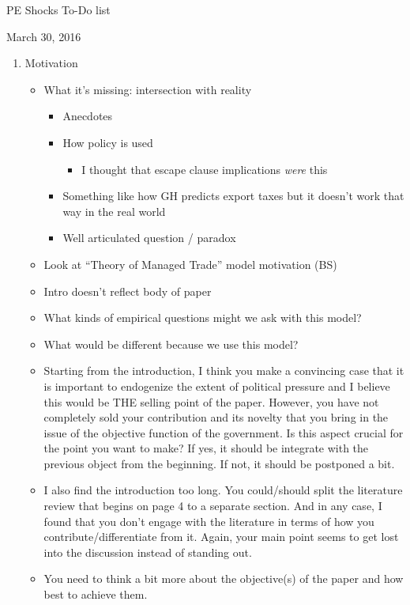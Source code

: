 \documentclass[12pt]{article}
\begin{document}
\begin{center}
PE Shocks To-Do list
\end{center}

March 30, 2016
\begin{enumerate}
	\item Motivation
		\begin{itemize}
			\item What it's missing: intersection with reality
				\begin{itemize}
					\item Anecdotes
					\item How policy is used
						\begin{itemize}
							\item I thought that escape clause implications \textit{were} this
						\end{itemize}
					\item Something like how GH predicts export taxes but it doesn't work that way in the real world
					\item Well articulated question / paradox
				\end{itemize}
			\item Look at ``Theory of Managed Trade'' model motivation (BS)
			\item Intro doesn't reflect body of paper
			\item What kinds of empirical questions might we ask with this model?
			\item What would be different because we use this model?
			\item Starting from the introduction, I think you make a convincing case that it is important to endogenize the extent of political pressure and I believe this would be THE selling point of the paper. However, you have not completely sold your contribution and its novelty that you bring in the issue of the objective function of the government. Is this aspect crucial for the point you want to make? If yes, it should be integrate with the previous object from the beginning. If not, it should be postponed a bit.
			\item I also find the introduction too long. You could/should split the literature review that begins on page 4 to a separate section. And in any case, I found that you don't engage with the literature in terms of how you contribute/differentiate from it. Again, your main point seems to get lost into the discussion instead of standing out.
			\item You need to think a bit more about the objective(s) of the paper and how best to achieve them.
		\end{itemize}
		

\end{enumerate}
\end{document}
